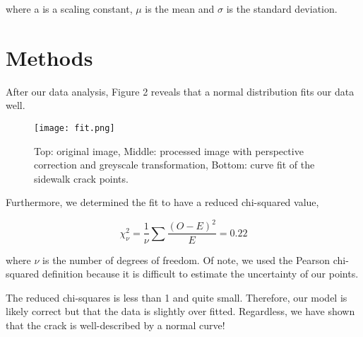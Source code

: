 \documentclass{article}
\begin{document}
where a is a scaling constant, $\mu$ is the mean and $\sigma$ is the standard deviation.

\section{Methods}
After our data analysis, Figure 2 reveals that a normal distribution fits our data well.
\begin{figure}[h]
    \centering
    \texttt{[image: fit.png]}
    \caption{ Top: original image, Middle: processed image with perspective correction and greyscale transformation, Bottom: curve fit of the sidewalk crack points.}
\end{figure}

Furthermore, we determined the fit to have a reduced chi-squared value,

\begin{equation}
    \chi^2_\nu = \frac{1}{\nu} \sum\frac{(O-E)^2}{E}=0.22
\end{equation}

where $\nu$ is the number of degrees of freedom. Of note, we used the Pearson chi-squared definition because it
is difficult to estimate the uncertainty of our points.

The reduced chi-squares is less than 1 and quite small. Therefore, our model is likely correct but that the
data is slightly over fitted. Regardless, we have shown that the crack is well-described by a normal curve!



\nocite{*}
\cite{2020SciPy-NMeth}
\end{document}
